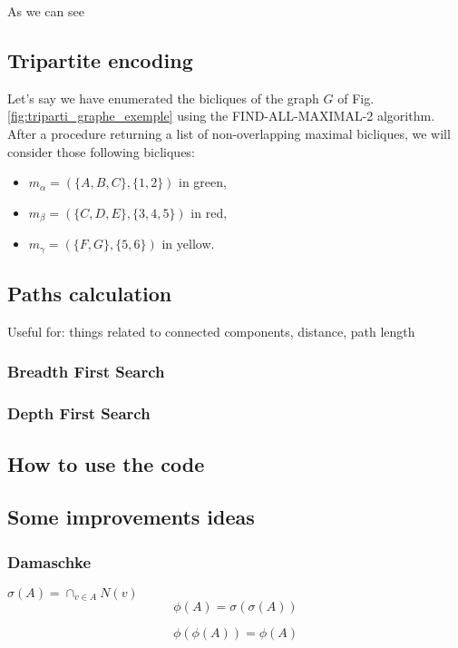\documentclass[table]{report}
\begin{document}
As we can see


\subsection{Tripartite encoding}


Let's say we have enumerated the bicliques of the graph $G$ of Fig. \ref{fig:triparti_graphe_exemple} using the FIND-ALL-MAXIMAL-2 algorithm. After a procedure returning a list of non-overlapping maximal bicliques, we will consider those following bicliques:

\begin{itemize}
\item $m_\alpha = (\{A,B,C\}, \{1,2\})$ in green,  
\item $m_\beta = (\{C,D,E\}, \{3,4,5\})$ in red, 
\item $m_\gamma = (\{F,G\}, \{5,6\})$ in yellow.
\end{itemize}

 
\subsection{Paths calculation}

Useful for: things related to connected components, distance, path length

\subsubsection{Breadth First Search}
\subsubsection{Depth First Search}

\subsection{How to use the code}
\subsection*{Some improvements ideas}

\subsubsection{Damaschke}

$\sigma(A) = \cap_{v\in A} N(v)$
$$\phi(A) = \sigma(\sigma(A))$$

$$\phi(\phi(A)) = \phi(A)$$
\end{document}
